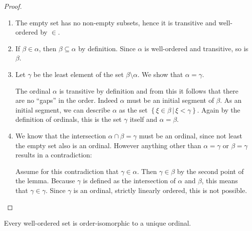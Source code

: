 \documentclass[../../main.tex]{subfiles}
\begin{document}
\begin{proof}
    \begin{enumerate}
        \item The empty set has no non-empty subsets, hence it is transitive and well-ordered by $\in$.
        \item If $\beta \in \alpha$, then $\beta \subseteq \alpha$ by definition. Since $\alpha$ is well-ordered and transitive, so is $\beta$.
        \item Let $\gamma$ be the least element of the set $\beta \setminus \alpha$. We show that $\alpha = \gamma$.
        
        The ordinal $\alpha$ is transitive by definition and from this it follows that there are no ``gaps'' in the order. Indeed $\alpha$ must be an initial segment of $\beta$.
        As an initial segment, we can describe $\alpha$ as the set $\left\{\xi \in \beta \,\vert\, \xi < \gamma\right\}$.
        Again by the definition of ordinals, this is the set $\gamma$ itself and $\alpha = \beta$.
        \item We know that the intersection $\alpha \cap \beta = \gamma$ must be an ordinal, since not least the empty set also is an ordinal.
        However anything other than $\alpha = \gamma$ or $\beta = \gamma$ results in a contradiction:
        
        Assume for this contradiction that $\gamma \in \alpha$. Then $\gamma \in \beta$ by the second point of the lemma. 
        Because $\gamma$ is defined as the intersection of $\alpha$ and $\beta$, this means that $\gamma \in \gamma$.
        Since $\gamma$ is an ordinal, strictly linearly ordered, this is not possible. \qedhere
    \end{enumerate}
\end{proof}

\begin{theorem}\label{unique-ordinal}\cite[Theorem 2, p.15]{Jec78}
    Every well-ordered set is order-isomorphic to a unique ordinal.
\end{theorem}
\end{document}
